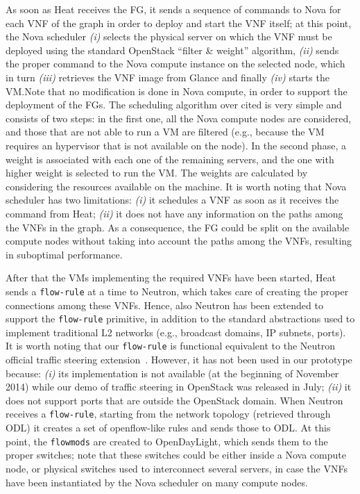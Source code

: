 {As soon as Heat receives the FG, it sends a sequence of commands to Nova for each VNF of the graph in order to deploy and start the VNF itself; at this point, the Nova scheduler \textit{(i)} selects the physical server on which the VNF must be deployed using the standard OpenStack ``filter \& weight'' algorithm, \textit{(ii)} sends the proper command to the Nova compute instance on the selected node, which in turn \textit{(iii)} retrieves the VNF image from Glance and finally \textit{(iv)} starts the VM.Note that no modification is done in Nova compute, in order to support the deployment of the FGs.
The scheduling algorithm over cited is very simple and consists of two steps: in the first one, all the Nova compute nodes are considered, and those that are not able to run a VM are filtered (e.g., because the VM requires an hypervisor that is not available on the node). 
In the second phase, a weight is associated with each one of the remaining servers, and the one with higher weight is selected to run the VM.
The weights are calculated by considering the resources available on the machine.
It is worth noting that Nova scheduler has two limitations: \textit{(i)} it schedules a VNF as soon as it receives the command from Heat; \textit{(ii)} it does not have any information on the paths among the VNFs in the graph.
As a consequence, the FG could be split on the available compute nodes without taking into account the paths among the VNFs, resulting in suboptimal performance.

	
After that the VMs implementing the required VNFs have been started, Heat sends a \texttt{flow-rule} at a time to Neutron, which takes care of creating the proper connections among these VNFs.
Hence, also Neutron has been extended to support the \texttt{flow-rule} primitive, in addition to the standard abstractions used to implement traditional L2 networks (e.g., broadcast domains, IP subnets, ports).
It is worth noting that our \texttt{flow-rule} is functional equivalent to the Neutron official traffic steering extension~\cite{neutronsteeringofficial}.
However, it has not been used in our prototype because: \textit{(i)} its implementation is not available (at the beginning of November 2014) while our demo of traffic steering in OpenStack was released in July; \textit{(ii)} it does not support ports that are outside the OpenStack domain.
When Neutron receives a \texttt{flow-rule}, starting from the network topology (retrieved through ODL) it creates a set of openflow-like rules and sends those to ODL.
At this point, the \texttt{flowmods} are created to OpenDayLight, which sends them to the proper switches; note that these switches could be either inside a Nova compute node, or physical switches used to interconnect several servers, in case the VNFs have been instantiated by the Nova scheduler on many compute nodes.

}
